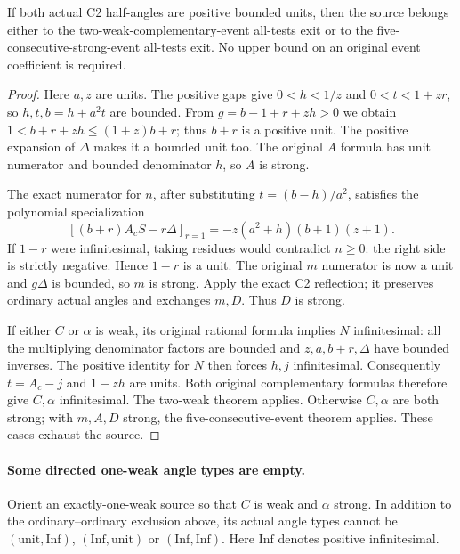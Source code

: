 \begin{theorem}
If both actual C2 half-angles are positive bounded units, then the
source belongs either to the two-weak-complementary-event all-tests
exit or to the five-consecutive-strong-event all-tests exit. No upper
bound on an original event coefficient is required.
\end{theorem}
\begin{proof}
Here $a,z$ are units. The positive gaps give $0<h<1/z$ and
$0<t<1+zr$, so $h,t,b=h+a^2t$ are bounded. From
$g=b-1+r+zh>0$ we obtain $1<b+r+zh\le(1+z)b+r$;
thus $b+r$ is a positive unit. The positive expansion of $\Delta$
makes it a bounded unit too. The original $A$ formula has unit
numerator and bounded denominator $h$, so $A$ is strong.

The exact numerator for $n$, after substituting $t=(b-h)/a^2$,
satisfies the polynomial specialization
\[
 \left[(b+r)A_cS-r\Delta\right]_{r=1}
     =-z(a^2+h)(b+1)(z+1).
\]
If $1-r$ were infinitesimal, taking residues would contradict
$n\ge0$: the right side is strictly negative. Hence $1-r$ is a
unit. The original $m$ numerator is now a unit and $g\Delta$ is
bounded, so $m$ is strong. Apply the exact C2 reflection; it preserves
ordinary actual angles and exchanges $m,D$. Thus $D$ is strong.

If either $C$ or $\alpha$ is weak, its original rational formula
implies $N$ infinitesimal: all the multiplying denominator factors
are bounded and $z,a,b+r,\Delta$ have bounded inverses. The positive
identity for $N$ then forces $h,j$ infinitesimal. Consequently
$t=A_c-j$ and $1-zh$ are units. Both original complementary formulas
therefore give $C,\alpha$ infinitesimal. The two-weak theorem applies.
Otherwise $C,\alpha$ are both strong; with $m,A,D$ strong, the
five-consecutive-event theorem applies. These cases exhaust the source.
\end{proof}

\paragraph{Some directed one-weak angle types are empty.}
Orient an exactly-one-weak source so that $C$ is weak and $\alpha$
strong. In addition to the ordinary--ordinary exclusion above, its
actual angle types cannot be $(\mathrm{unit},\mathrm{Inf})$,
$(\mathrm{Inf},\mathrm{unit})$ or $(\mathrm{Inf},\mathrm{Inf})$.
Here $\mathrm{Inf}$ denotes positive infinitesimal.

